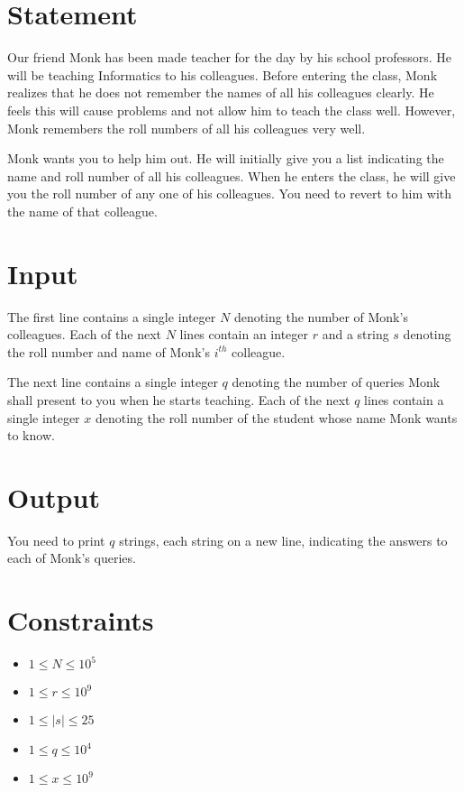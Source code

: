 \documentclass{article}
\begin{document}
\section*{Statement}

Our friend Monk has been made teacher for the day by his school professors. He will be teaching Informatics to his colleagues. Before entering the class, Monk realizes that he does not remember the names of all his colleagues clearly. He feels this will cause problems and not allow him to teach the class well. However, Monk remembers the roll numbers of all his colleagues very well.

Monk wants you to help him out. He will initially give you a list indicating the name and roll number of all his colleagues. When he enters the class, he will give you the roll number of any one of his colleagues. You need to revert to him with the name of that colleague.

\section*{Input}

The first line contains a single integer $N$ denoting the number of Monk's colleagues. Each of the next $N$ lines contain an integer $r$ and a string $s$ denoting the roll number and name of Monk's $i^{th}$ colleague.

The next line contains a single integer $q$ denoting the number of queries Monk shall present to you when he starts teaching. Each of the next $q$ lines contain a single integer $x$ denoting the roll number of the student whose name Monk wants to know.

\section*{Output}

You need to print $q$ strings, each string on a new line, indicating the answers to each of Monk's queries. 

\section*{Constraints}

\begin{itemize}
    \item $1 \le N \le 10^{5}$
    \item $1 \le r \le 10^{9}$
    \item $1 \le |s| \le 25$
    \item $1 \le q \le 10^{4}$
    \item $1 \le x \le 10^{9}$
\end{itemize}
\end{document}
